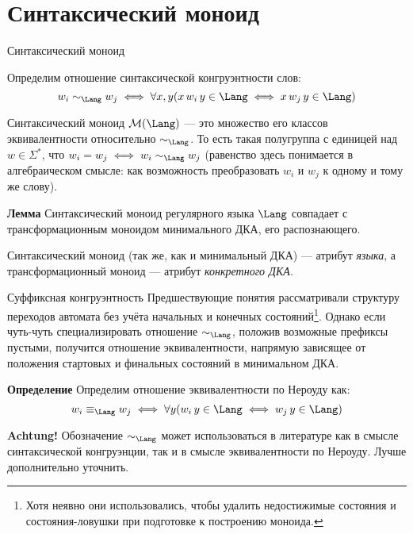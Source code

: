 \section{Синтаксический моноид} %
\begin{frame}{Синтаксический моноид}
\vspace*{-7pt}
\begin{block}{}
Определим отношение синтаксической конгруэнтности слов:
\vspace*{-4pt}
\[w_i\sim_{\Lang} w_j\iff \forall x,y(x\,w_i\,y\in\Lang\iff x\,w_j\,y\in\Lang)\]

\vspace*{-4pt}
Синтаксический моноид $\mathcal{M}(\Lang)$ --- это множество его классов эквивалентности относительно $\sim_{\Lang}$. То есть такая полугруппа с единицей над $w\in\Sigma^*$, что $w_i= w_j\iff w_i\sim_{\Lang} w_j$ (равенство здесь понимается в алгебраическом смысле: как возможность преобразовать $w_i$ и $w_j$ к одному и тому же слову).
\end{block} %

\begin{block}{\bf Лемма}
Синтаксический моноид регулярного языка $\Lang$ совпадает с трансформационным моноидом  минимального ДКА, его распознающего.
\end{block} %

\begin{alertblock}{}
Синтаксический моноид (так же, как и минимальный ДКА) --- атрибут \textit{языка}, а трансформационный моноид --- атрибут \textit{конкретного ДКА}.
\end{alertblock} %
\end{frame}

\begin{frame}{Суффиксная конгруэнтность}
Предшествующие понятия рассматривали  структуру переходов автомата без учёта начальных и конечных состояний\footnote{Хотя неявно они использовались, чтобы удалить недостижимые состояния и состояния-ловушки при подготовке к построению моноида.}. Однако если чуть-чуть специализировать отношение $\sim_{\Lang}$, положив возможные префиксы пустыми, получится отношение эквивалентности, напрямую зависящее от положения стартовых и финальных состояний в минимальном ДКА. %

\vspace*{-5pt}
\begin{block}{\bf Определение}
Определим отношение эквивалентности по Нероуду как:
\vspace*{-5pt}
\[w_i\equiv_{\Lang} w_j\iff \forall y(w_i\,y\in\Lang\iff w_j\,y\in\Lang)\]

\end{block} %

\begin{alertblock}{\bf Achtung!}
Обозначение $\sim_{\Lang}$ может использоваться в литературе как в смысле синтаксической конгруэнции, так и в смысле эквивалентности по Нероуду. Лучше дополнительно уточнить.
\end{alertblock} %
\end{frame}

